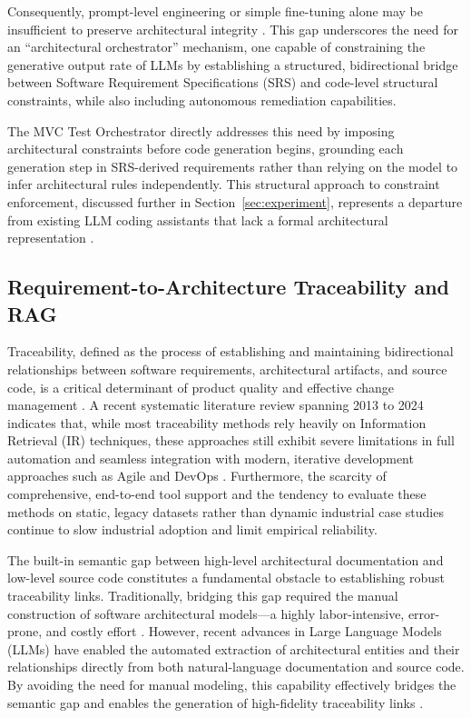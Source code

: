 Consequently, prompt-level engineering or simple fine-tuning alone may
be insufficient to preserve architectural integrity
\citep{Dente2026, Zhu2026}. This gap underscores the need for an
``architectural orchestrator'' mechanism, one capable of constraining
the generative output rate of LLMs by establishing a structured,
bidirectional bridge between Software Requirement Specifications (SRS)
and code-level structural constraints, while also including autonomous
remediation capabilities.

The MVC Test Orchestrator directly addresses this need by imposing
architectural constraints before code generation begins, grounding each
generation step in SRS-derived requirements rather than relying on the
model to infer architectural rules independently. This structural
approach to constraint enforcement, discussed further in Section~\ref{sec:experiment},
represents a departure from existing LLM coding assistants that lack a
formal architectural representation \citep{Cervantes2026}.

\subsection{Requirement-to-Architecture Traceability and RAG}
\label{sec:related_traceability}

Traceability, defined as the process of establishing and maintaining
bidirectional relationships between software requirements,
architectural artifacts, and source code, is a critical determinant of
product quality and effective change management \citep{Li2022}. A
recent systematic literature review spanning 2013 to 2024 indicates
that, while most traceability methods rely heavily on Information
Retrieval (IR) techniques, these approaches still exhibit severe
limitations in full automation and seamless integration with modern,
iterative development approaches such as Agile and DevOps
\citep{Koboyatshwene2025}. Furthermore, the scarcity of comprehensive,
end-to-end tool support and the tendency to evaluate these methods on
static, legacy datasets rather than dynamic industrial case studies
continue to slow industrial adoption and limit empirical reliability.

The built-in semantic gap between high-level architectural
documentation and low-level source code constitutes a fundamental
obstacle to establishing robust traceability links. Traditionally,
bridging this gap required the manual construction of software
architectural models---a highly labor-intensive, error-prone, and
costly effort \citep{Clements2002}. However, recent advances in Large
Language Models (LLMs) have enabled the automated extraction of
architectural entities and their relationships directly from both
natural-language documentation and source code. By avoiding the need
for manual modeling, this capability effectively bridges the semantic
gap and enables the generation of high-fidelity traceability links
\citep{Fuchs2025}.

